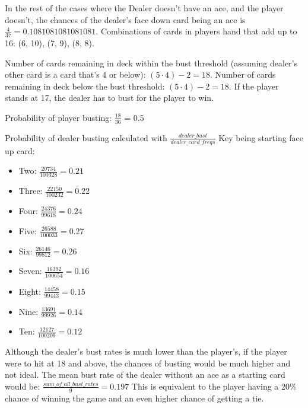 \documentclass{article}
\begin{document}
        \vspace{0.25cm}

        \hspace{-0.5cm}In the rest of the cases where the Dealer doesn't have an ace, and the player doesn't, the chances of the dealer's face down card being an ace is $\frac{4}{37} = 0.1081081081081081$. Combinations of cards in players hand that add up to 16: (6, 10), (7, 9), (8, 8).

        \vspace{0.25cm}
        
        \hspace{-0.6cm} Number of cards remaining in deck within the bust threshold (assuming dealer's other card is a card that's 4 or below): $(5 \cdot 4) - 2 = 18$. Number of cards remaining in deck below the bust threshold: $(5 \cdot 4) - 2 = 18$. If the player stands at 17, the dealer has to bust for the player to win.
        
        \vspace{0.25cm}
        
        \hspace{-0.5cm}Probability of player busting: $\frac{18}{36}$ = 0.5

        \vspace{0.25cm}

        \hspace{-0.5cm}Probability of dealer busting calculated with $\frac{dealer\_bust}{dealer\_card\_freqs}$ Key being starting face up card:
        \begin{itemize}
            \item Two: $\frac{20734}{100328} = 0.21$
            \item Three: $\frac{22150}{100232} = 0.22$
            \item Four: $\frac{24376}{99618} = 0.24$
            \item Five: $\frac{26588}{100033} = 0.27$
            \item Six: $\frac{26146}{99812} = 0.26$
            \item Seven: $\frac{16392}{100654} = 0.16$
            \item Eight: $\frac{14458}{99443} = 0.15$
            \item Nine: $\frac{13691}{99926} = 0.14$
            \item Ten: $\frac{12127}{100209} = 0.12$
        \end{itemize}

        \hspace{-0.5cm}Although the dealer's bust rates is much lower than the player's, if the player were to hit at 18 and above, the chances of busting would be much higher and not ideal. The mean bust rate of the dealer without an ace as a starting card would be: $\frac{sum\_of\_all\_bust\_rates}{9} = 0.197$ 
        This is equivalent to the player having a 20\% chance of winning the game and an even higher chance of getting a tie. 
\end{document}
